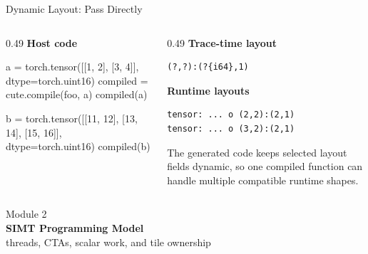 \documentclass[aspectratio=169,11pt]{beamer}
\newcommand{\code}[1]{\texttt{\detokenize{#1}}}
\begin{document}
\begin{frame}[fragile]{Dynamic Layout: Pass \code{torch.Tensor} Directly}
\begin{columns}[T,totalwidth=\textwidth]
  \begin{column}{0.49\textwidth}
    \small\textbf{Host code}
\begin{TraceCode}
a = torch.tensor([[1, 2], [3, 4]],
                 dtype=torch.uint16)
compiled = cute.compile(foo, a)
compiled(a)

b = torch.tensor([[11, 12],
                  [13, 14],
                  [15, 16]],
                 dtype=torch.uint16)
compiled(b)
\end{TraceCode}
  \end{column}

  \begin{column}{0.49\textwidth}
    \small\textbf{Trace-time layout}
\begin{lstlisting}[style=terminal]
(?,?):(?{i64},1)
\end{lstlisting}

    \vspace{0.45em}
    \small\textbf{Runtime layouts}
\begin{lstlisting}[style=terminal]
tensor: ... o (2,2):(2,1)
tensor: ... o (3,2):(2,1)
\end{lstlisting}

    \vspace{0.25em}
    \footnotesize\color{TraceNote}
    The generated code keeps selected layout fields dynamic, so one compiled
    function can handle multiple compatible runtime shapes.
  \end{column}
\end{columns}
\end{frame}

\begin{frame}[plain]
  \hypertarget{mod:simt}{}
  \centering
  \vfill
  {\small\color{gray} Module 2}\\[0.5em]
  {\Huge\bfseries SIMT Programming Model}\\[1em]
  {\large threads, CTAs, scalar work, and tile ownership}
  \vfill
\end{frame}
\end{document}
